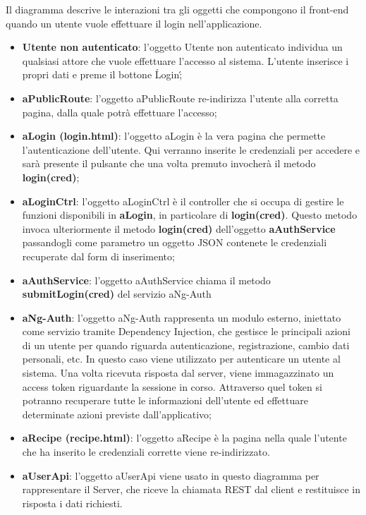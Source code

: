 	Il diagramma descrive le interazioni tra gli oggetti che compongono il front-end quando un utente vuole effettuare il login nell'applicazione.
	\begin{itemize}
		\item \textbf{Utente non autenticato}: l'oggetto Utente non autenticato individua un qualsiasi attore che vuole effettuare l'accesso al sistema. L'utente inserisce i propri dati e preme il bottone \'Login\';
		\item \textbf{aPublicRoute}: l'oggetto aPublicRoute re-indirizza l'utente alla corretta pagina, dalla quale potrà effettuare l'accesso;
		\item \textbf{aLogin (login.html)}: l'oggetto aLogin è la vera pagina che permette l'autenticazione dell'utente. Qui verranno inserite le credenziali per accedere e sarà presente il pulsante che una volta premuto invocherà il metodo \textbf{login(cred)};
		\item \textbf{aLoginCtrl}: l'oggetto aLoginCtrl è il controller che si occupa di gestire le funzioni disponibili in \textbf{aLogin}, in particolare di \textbf{login(cred)}. Questo metodo invoca ulteriormente il metodo \textbf{login(cred)} dell'oggetto \textbf{aAuthService} passandogli come parametro un oggetto JSON contenete le credenziali recuperate dal form di inserimento;
		\item \textbf{aAuthService}: l'oggetto aAuthService chiama il metodo \textbf{submitLogin(cred)} del servizio aNg-Auth
		\item \textbf{aNg-Auth}: l'oggetto aNg-Auth rappresenta un modulo esterno, iniettato come servizio tramite Dependency Injection, che gestisce le principali azioni di un utente per quando riguarda autenticazione, registrazione, cambio dati personali, etc. In questo caso viene utilizzato per autenticare un utente al sistema. Una volta ricevuta risposta dal server, viene immagazzinato un access token riguardante la sessione in corso. Attraverso quel token si potranno recuperare tutte le informazioni dell'utente ed effettuare determinate azioni previste dall'applicativo;
		\item \textbf{aRecipe (recipe.html)}: l'oggetto aRecipe è la pagina nella quale l'utente che ha inserito le credenziali corrette viene re-indirizzato.
		\item \textbf{aUserApi}: l'oggetto aUserApi viene usato in questo diagramma per rappresentare il Server, che riceve la chiamata REST dal client e restituisce in risposta i dati richiesti.
	\end{itemize}

